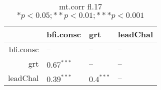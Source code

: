 \begin{table}[ht]
\centering
\begin{tabular}{rlll}
  \hline
 & bfi.consc & grt & leadChal \\ 
  \hline
bfi.consc & -- & -- & -- \\ 
  grt & $0.67^{***}$ & -- & -- \\ 
  leadChal & $0.39^{***}$ & $0.4^{***}$ & -- \\ 
   \hline
\end{tabular}
\caption{mt.corr fl.17 $* p < 0.05; ** p < 0.01; *** p < 0.001$} 
\label{freq_corr.mt.corr.fl.17}
\end{table}
